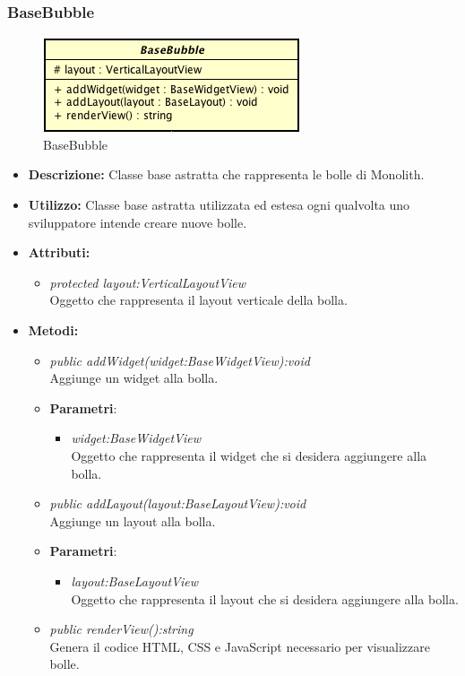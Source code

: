 \subsubsection{BaseBubble}

\label{BaseBubble}
\begin{figure}[ht]
	\centering
	\includegraphics[scale=0.5]{Sezioni/SottosezioniST/img/BaseBubble.png}
	\caption{BaseBubble}
\end{figure}

\begin{itemize}
\item \textbf{Descrizione:} Classe base astratta che rappresenta le bolle di Monolith.
\item \textbf{Utilizzo:} Classe base astratta utilizzata ed estesa ogni qualvolta uno sviluppatore intende creare nuove bolle.
\item \textbf{Attributi:} 
\begin{itemize}
\item \textit{protected layout:VerticalLayoutView}\\
Oggetto che rappresenta il layout verticale della bolla.
\end{itemize}
\item \textbf{Metodi:}
\begin{itemize}
\item \textit{public addWidget(widget:BaseWidgetView):void}\\
Aggiunge un widget alla bolla.
\item{\textbf{Parametri}: \begin{itemize}
\item \textit{widget:BaseWidgetView}\\
Oggetto che rappresenta il widget che si desidera aggiungere alla bolla.
\end{itemize}}
\item \textit{public addLayout(layout:BaseLayoutView):void}\\
Aggiunge un layout alla bolla.
\item{\textbf{Parametri}: \begin{itemize}
\item \textit{layout:BaseLayoutView}\\
Oggetto che rappresenta il layout che si desidera aggiungere alla bolla.
\end{itemize}}
\item \textit{public renderView():string}\\
Genera il codice HTML, CSS e JavaScript necessario per visualizzare bolle.
\end{itemize}
\end{itemize}


